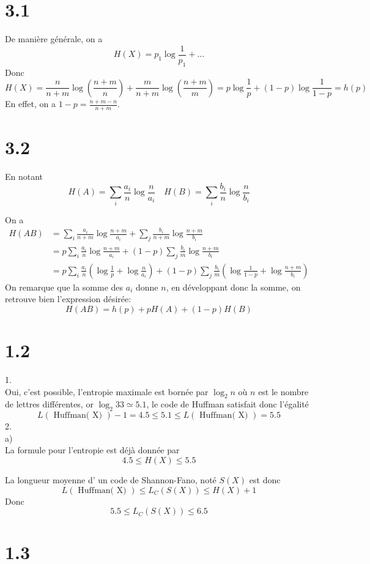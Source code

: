 \documentclass[11pt, a4paper, twoside]{article}
\begin{document}
\section*{3.1}
De manière générale, on a 
\[ 
	H( X) = p_1 \log \frac{1}{p_1} + \ldots
\]
Donc
\[ 
	H( X) = \frac{n}{n+m}\log ( \frac{n+m}{n}) +\frac{m}{n+m}\log ( \frac{n+m}{m}) = p \log \frac{1}{p} + ( 1-p) \log \frac{1}{1-p} = h( p) 
\]
En effet, on a $1-p = \frac{n+m - n}{n+m}$.
\section*{3.2}
En notant
\[ 
H( A ) = \sum_i \frac{a_i}{n}\log \frac{n}{a_i} \quad H( B ) = \sum_i \frac{b_i}{n}\log \frac{n}{b_i}
\]

On a 
\begin{align*}
	H( AB) &= \sum_i \frac{a_i}{n+m} \log \frac{n+m}{a_i} + \sum_j \frac{b_i}{n+m} \log \frac{n+m}{b_i}\\
&= p \sum_i  \frac{a_i}{n}\log \frac{n+m}{a_i} + ( 1-p) \sum_j \frac{b_i}{m} \log \frac{n+m}{b_i}\\
&= p \sum_i  \frac{a_i}{n} ( \log \frac{1}{p}+\log \frac{n}{a_i} ) + ( 1-p) \sum_j \frac{b_i}{m} ( \log \frac{1}{1-p} +\log \frac{n+m}{b_i} )
\end{align*}
On remarque que la somme des $a_i$ donne $n$, en développant donc la somme, on retrouve bien l'expression désirée:
\[ 
	H( AB) = h( p) + p H( A)  + ( 1-p) H( B) 
\]

\section*{1.2}

1.\\
Oui, c'est possible, l'entropie maximale est bornée par $\log_2 n$ où $n$ est le nombre de lettres différentes, or $ \log_2 33 \simeq 5.1$, le code de Huffman satisfait donc l'égalité
\[ 
	L(\text{ Huffman( X)  })-1 = 4.5 \leq 5.1 \leq  L(\text{ Huffman( X)  }) = 5.5
\]
2.\\
a)\\
La formule pour l'entropie est déjà donnée par
\[ 
	4.5 \leq H( X)  \leq 5.5
\]

La longueur moyenne d' un code de Shannon-Fano, noté $S( X) $ est donc
\[ 
	L(\text{ Huffman( X)  }) \leq L_C ( S( X) ) \leq H( X) +1
\]
Donc
\[ 
	5.5 \leq L_C( S( X) ) \leq 6.5
\]




\section*{1.3}
\end{document}
